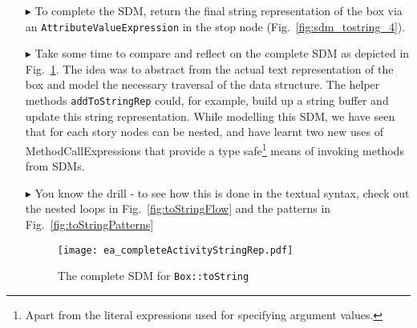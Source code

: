 \begin{itemize}
\item[$\blacktriangleright$] To complete the SDM, return the final string representation of the box via an \texttt{AttributeValueExpression} in the stop node
(Fig.~\ref{fig:sdm_tostring_4}).



\item[$\blacktriangleright$] Take some time to compare and reflect on the complete SDM as depicted in Fig.~\ref{fig:sdm_tostring_5}.  The idea was to abstract
from the actual text representation of the box and model the necessary traversal of the data structure. The helper methods \texttt{addToStringRep} could, for example, build up a
string buffer and update this string representation. While modelling this SDM, we have seen that for each story nodes can be nested, and have learnt two new
uses of MethodCallExpressions that provide a type safe\footnote{Apart from the literal expressions used for specifying argument values.} means of invoking
methods from SDMs.

\item[$\blacktriangleright$] You know the drill - to see how this is done in the textual syntax, check out the nested loops in Fig.~\ref{fig:toStringFlow} and
the patterns in Fig.~\ref{fig:toStringPatterns}

\begin{figure}[htbp]
\begin{center}
  \texttt{[image: ea\_completeActivityStringRep.pdf]}
  \caption{The complete SDM for \texttt{Box::toString}}  
  \label{fig:sdm_tostring_5}
\end{center}
\end{figure}
\FloatBarrier

\end{itemize}

